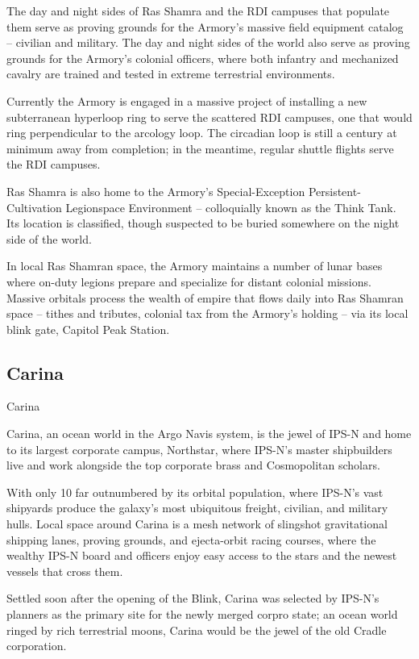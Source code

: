 The day and night sides of Ras Shamra and the RDI campuses that populate them serve as
proving grounds for the Armory’s massive field equipment catalog -- civilian and military. The day
and night sides of the world also serve as proving grounds for the Armory’s colonial officers,
where both infantry and mechanized cavalry are trained and tested in extreme terrestrial
environments.

Currently the Armory is engaged in a massive project of installing a new subterranean hyperloop
ring to serve the scattered RDI campuses, one that would ring perpendicular to the arcology loop.
The circadian loop is still a century at minimum away from completion; in the meantime, regular
shuttle flights serve the RDI campuses.

Ras Shamra is also home to the Armory’s Special-Exception Persistent-Cultivation Legionspace
Environment -- colloquially known as the Think Tank. Its location is classified, though suspected to
be buried somewhere on the night side of the world.

In local Ras Shamran space, the Armory maintains a number of lunar bases where on-duty
legions prepare and specialize for distant colonial missions. Massive orbitals process the wealth
of empire that flows daily into Ras Shamran space -- tithes and tributes, colonial tax from the
Armory’s holding -- via its local blink gate, Capitol Peak Station.
\subsection{Carina}
Carina

Carina, an ocean world in the Argo Navis system, is the jewel of IPS-N and home to its largest
corporate campus, Northstar, where IPS-N’s master shipbuilders live and work alongside the top
corporate brass and Cosmopolitan scholars.

With only 10%
far outnumbered by its orbital population, where IPS-N’s vast shipyards produce the galaxy’s most
ubiquitous freight, civilian, and military hulls. Local space around Carina is a mesh network of
slingshot gravitational shipping lanes, proving grounds, and ejecta-orbit racing courses, where the
wealthy IPS-N board and officers enjoy easy access to the stars and the newest vessels that
cross them.

Settled soon after the opening of the Blink, Carina was selected by IPS-N’s planners as the
primary site for the newly merged corpro state; an ocean world ringed by rich terrestrial moons,
Carina would be the jewel of the old Cradle corporation.

